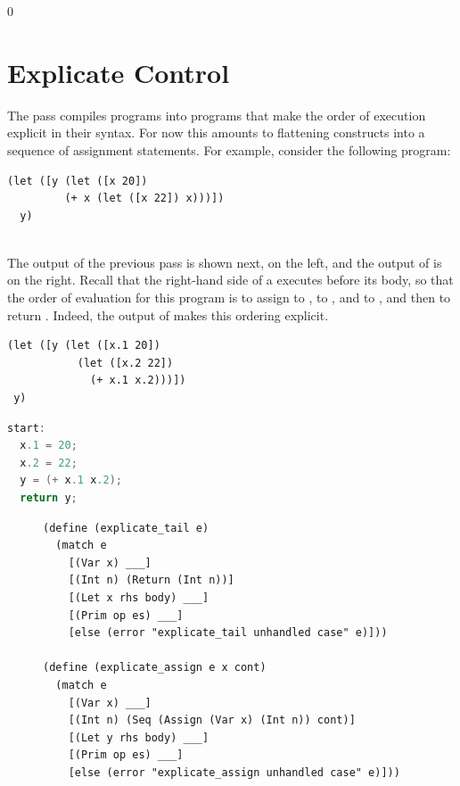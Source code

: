\documentclass[7x10]{TimesAPriori_MIT}%
\def\racketEd{0}
\def\edition{0}
\numberwithin{theorem}{chapter}
\numberwithin{definition}{chapter}
\numberwithin{equation}{chapter}
\begin{document}
{\if\edition\racketEd  
\section{Explicate Control}
\label{sec:explicate-control-Lvar}

The  pass compiles \LangVar{} programs into \LangCVar{}
programs that make the order of execution explicit in their
syntax. For now this amounts to flattening  constructs into a
sequence of assignment statements. For example, consider the following
\LangVar{} program:\\
\begin{minipage}{0.96\textwidth}
\begin{lstlisting}
(let ([y (let ([x 20])
         (+ x (let ([x 22]) x)))])
  y)
\end{lstlisting}
\end{minipage}\\
%
The output of the previous pass is shown next, on the left, and the
output of  is on the right. Recall that the
right-hand side of a  executes before its body, so that the order
of evaluation for this program is to assign  to ,
 to , and  to , and then to
return . Indeed, the output of  makes
this ordering explicit.
\begin{transformation}
\begin{lstlisting}
(let ([y (let ([x.1 20]) 
           (let ([x.2 22])
             (+ x.1 x.2)))])
 y)
\end{lstlisting}
\compilesto
\begin{lstlisting}[language=C]
start:
  x.1 = 20;
  x.2 = 22;
  y = (+ x.1 x.2);
  return y;
\end{lstlisting}
\end{transformation}

\begin{figure}[tbp]
\begin{tcolorbox}[colback=white]
\begin{lstlisting}
(define (explicate_tail e)
  (match e
    [(Var x) ___]
    [(Int n) (Return (Int n))]
    [(Let x rhs body) ___]
    [(Prim op es) ___]
    [else (error "explicate_tail unhandled case" e)]))

(define (explicate_assign e x cont)
  (match e
    [(Var x) ___]
    [(Int n) (Seq (Assign (Var x) (Int n)) cont)]
    [(Let y rhs body) ___]
    [(Prim op es) ___]
    [else (error "explicate_assign unhandled case" e)]))


\end{lstlisting}
\end{tcolorbox}
\end{figure}}
\end{document}
